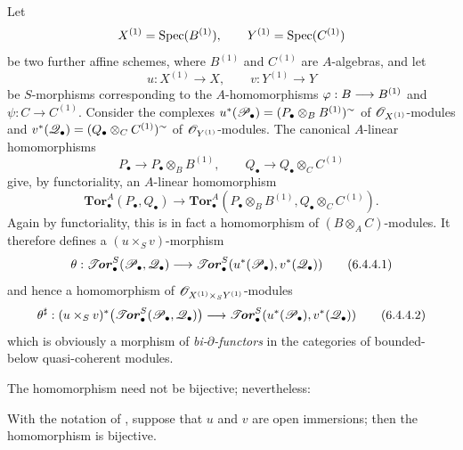 \begin{env}[6.4.4]
\label{III.6.4.4}
Let
\[
  X^{(1)}=\operatorname{Spec}(B^{(1)}),
  \qquad
  Y^{(1)}=\operatorname{Spec}(C^{(1)})
\]
be two further affine schemes, where $B^{(1)}$ and $C^{(1)}$ are
$A$-algebras, and let
\[
  u:X^{(1)}\longrightarrow X,
  \qquad
  v:Y^{(1)}\longrightarrow Y
\]
be $S$-morphisms corresponding to the $A$-homomorphisms
$\varphi:B\longrightarrow B^{(1)}$ and
$\psi:C\longrightarrow C^{(1)}$.  Consider the complexes
$u^*(\mathscr{P}_\bullet)=(P_\bullet\otimes_BB^{(1)})^{\sim}$ of
$\mathscr{O}_{X^{(1)}}$-modules and
$v^*(\mathscr{Q}_\bullet)=(Q_\bullet\otimes_CC^{(1)})^{\sim}$ of
$\mathscr{O}_{Y^{(1)}}$-modules.
The canonical $A$-linear homomorphisms
\[
  P_\bullet\longrightarrow P_\bullet\otimes_BB^{(1)},
  \qquad
  Q_\bullet\longrightarrow Q_\bullet\otimes_CC^{(1)}
\]
give, by functoriality, an $A$-linear homomorphism
\[
  \mathbf{Tor}_\bullet^A(P_\bullet,Q_\bullet)
  \longrightarrow
  \mathbf{Tor}_\bullet^A
  (P_\bullet\otimes_BB^{(1)},
   Q_\bullet\otimes_CC^{(1)}).
\]
Again by functoriality, this is in fact a homomorphism of
$(B\otimes_AC)$-modules.  It therefore defines a
$(u\times_Sv)$-morphism
\[
  \theta:
  \boldsymbol{\mathscr{T}\!\mathit{or}}_\bullet^S(\mathscr{P}_\bullet,\mathscr{Q}_\bullet)
  \longrightarrow
  \boldsymbol{\mathscr{T}\!\mathit{or}}_\bullet^S(u^*(\mathscr{P}_\bullet),v^*(\mathscr{Q}_\bullet))
  \tag{6.4.4.1}\label{III.6.4.4.1}
\]
and hence a homomorphism of
$\mathscr{O}_{X^{(1)}\times_SY^{(1)}}$-modules
\[
  \theta^\sharp:
  (u\times_Sv)^*
  \bigl(\boldsymbol{\mathscr{T}\!\mathit{or}}_\bullet^S(\mathscr{P}_\bullet,\mathscr{Q}_\bullet)\bigr)
  \longrightarrow
  \boldsymbol{\mathscr{T}\!\mathit{or}}_\bullet^S(u^*(\mathscr{P}_\bullet),v^*(\mathscr{Q}_\bullet))
  \tag{6.4.4.2}\label{III.6.4.4.2}
\]
which is obviously a morphism of \emph{bi-$\partial$-functors} in the
categories of bounded-below quasi-coherent modules.

The homomorphism  need not be bijective; nevertheless:
\end{env}

\begin{lemma}[6.4.5]
\label{III.6.4.5}
With the notation of , suppose that $u$ and $v$ are open
immersions; then the homomorphism  is bijective.
\end{lemma}

